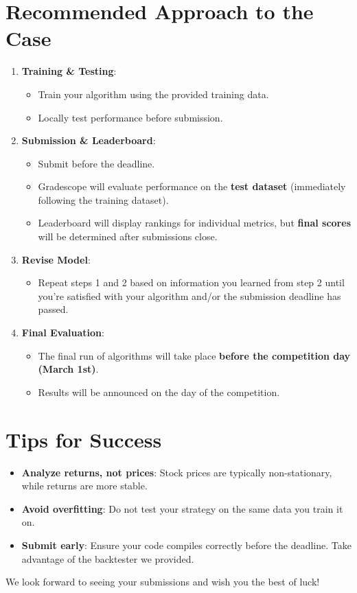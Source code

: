 \documentclass{article}
\begin{document}
\section{Recommended Approach to the Case}
\begin{enumerate}
    \item \textbf{Training \& Testing}:
    \begin{itemize}
        \item Train your algorithm using the provided training data.
        \item Locally test performance before submission.
    \end{itemize}
    \item \textbf{Submission \& Leaderboard}:
    \begin{itemize}
        \item Submit before the deadline.
        \item Gradescope will evaluate performance on the \textbf{test dataset} (immediately following the training dataset).
        \item Leaderboard will display rankings for individual metrics, but \textbf{final scores} will be determined after submissions close.
    \end{itemize}
    \item \textbf{Revise Model}:
    \begin{itemize}
        \item Repeat steps 1 and 2 based on information you learned from step 2 until you're satisfied with your algorithm and/or the submission deadline has passed.
    \end{itemize}
    \item \textbf{Final Evaluation}:
    \begin{itemize}
        \item The final run of algorithms will take place \textbf{before the competition day (March 1st)}.
        \item Results will be announced on the day of the competition.
    \end{itemize}
\end{enumerate}

\section{Tips for Success}
\begin{itemize}
    \item \textbf{Analyze returns, not prices}: Stock prices are typically non-stationary, while returns are more stable.
    \item \textbf{Avoid overfitting}: Do not test your strategy on the same data you train it on.
    \item \textbf{Submit early}: Ensure your code compiles correctly before the deadline. Take advantage of the backtester we provided.
\end{itemize}

We look forward to seeing your submissions and wish you the best of luck!
\end{document}

